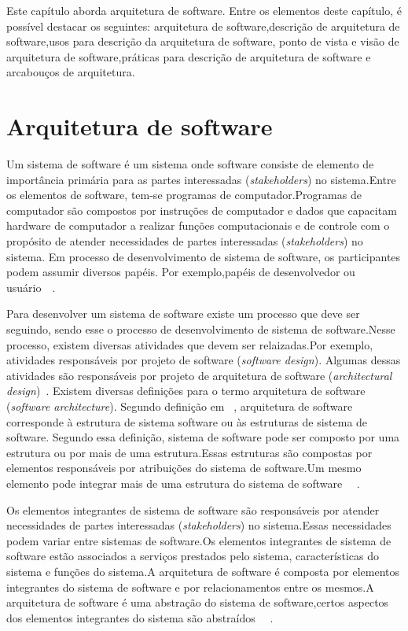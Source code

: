 Este capítulo aborda arquitetura de software. Entre os elementos deste capítulo, é possível destacar os seguintes: arquitetura de software,descrição de arquitetura de software,usos para  descrição da arquitetura de software, ponto de vista e visão de arquitetura de software,práticas para descrição de arquitetura de software e arcabouços de arquitetura.

\section{Arquitetura de software}

Um sistema de software é um sistema onde software consiste de elemento de importância primária para as partes interessadas (\emph{stakeholders}) no sistema.Entre os elementos de software, tem-se programas de computador.Programas de computador são compostos por instruções de computador e dados que capacitam hardware de computador a realizar funções computacionais e de controle com o propósito de atender necessidades de partes interessadas (\emph{stakeholders}) no sistema. Em processo de desenvolvimento de sistema de software, os participantes podem assumir diversos papéis. Por exemplo,papéis de desenvolvedor ou usuário~\cite{Sevocab}~\cite{ISO_24765}.

Para desenvolver um sistema de software existe um processo que deve ser seguindo, sendo esse o processo de desenvolvimento de sistema de software.Nesse processo, existem diversas atividades que devem ser relaizadas.Por exemplo, atividades responsáveis por projeto de software (\emph{software design}). Algumas dessas atividades  são responsáveis por projeto de arquitetura de software (\emph{architectural design})~\cite{Sommerville_2011_texbook}. Existem diversas definições para o termo arquitetura de software (\emph{software architecture}). Segundo definição em ~\cite{arq_01}, arquitetura de software corresponde à estrutura de sistema software ou às estruturas de sistema de software. Segundo essa definição, sistema de software pode ser composto por uma estrutura ou por mais de uma estrutura.Essas estruturas são compostas por elementos responsáveis por atribuições do sistema de software.Um mesmo elemento pode integrar mais de uma estrutura do sistema de software ~\cite{arq_01}~\cite{Carnegie_textbook}.

Os elementos integrantes de sistema de software são responsáveis por atender necessidades de partes interessadas (\emph{stakeholders}) no sistema.Essas necessidades podem variar entre sistemas de software.Os elementos integrantes de sistema de software estão associados a serviços prestados pelo sistema, características do sistema e funções do sistema.A arquitetura de software é composta por elementos integrantes do sistema de software e por relacionamentos entre os mesmos.A arquitetura de software é uma abstração do sistema de software,certos aspectos dos elementos integrantes do sistema são abstraídos ~\cite{arq_01}~\cite{Carnegie_textbook}.

